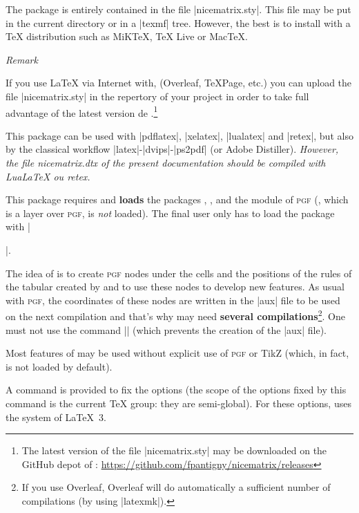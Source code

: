 \documentclass[dvipsnames]{article}
\begin{document}
\vspace{1cm}
The package  is entirely contained in the file
|nicematrix.sty|. This file may be put in the current directory or in a
|texmf| tree. However, the best is to install  with a TeX
distribution such as MiKTeX, TeX Live or MacTeX.

\medskip
\emph{Remark}

\nobreak
If you use LaTeX via Internet with, (Overleaf, TeXPage, etc.) you
can upload the file |nicematrix.sty| in the repertory of your 
project in order to take full advantage of the latest version de
.\footnote{The latest version of the file
|nicematrix.sty| may be downloaded on the GitHub depot of :\newline
\small
\url{https://github.com/fpantigny/nicematrix/releases}}

\medskip
This package can be used with |pdflatex|, |xelatex|, |lualatex| and |retex|, but
also by the classical workflow |latex|-|dvips|-|ps2pdf| (or Adobe Distiller).
\textsl{However, the file nicematrix.dtx of the present documentation should be
  compiled with LuaLaTeX ou retex.}

\medskip
This package requires and \textbf{loads} the packages ,
,  and the module  of \textsc{pgf}
(, which is a layer over \textsc{pgf}, is \emph{not} loaded). The
final user only has to load the package with |\usepackage{nicematrix}|.


\medskip
The idea of  is to create \textsc{pgf} nodes under the cells and
the positions of the rules of the tabular created by  and to use
these nodes to develop new features. As usual with \textsc{pgf}, the coordinates
of these nodes are written in the |aux| file to be used on the next compilation and
that's why  may need \textbf{several compilations}\footnote{If
  you use Overleaf, Overleaf will do automatically a sufficient number of
  compilations (by using |latexmk|).}. One must not use the command |\nofiles|
(which prevents the creation of the |aux| file).

\medskip
Most features of  may be used without explicit use of
\textsc{pgf} or TikZ (which, in fact, is not loaded by default).

\medskip
{}
A command  is provided to fix the options
(the scope of the options fixed by this command is the current TeX group: they
are semi-global). For these options,  uses the system
 of LaTeX~3.
\end{document}
